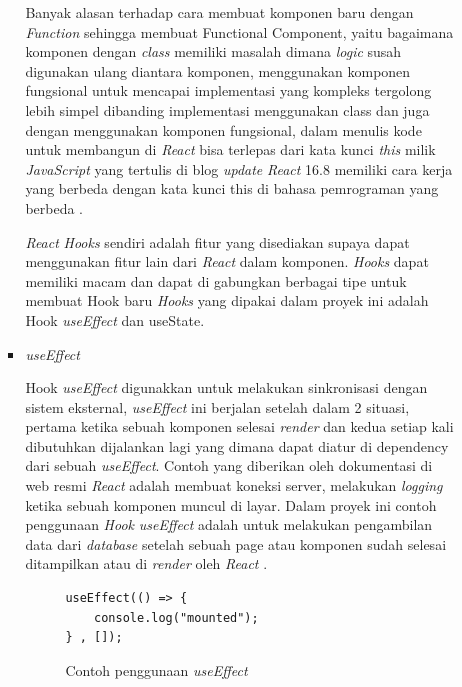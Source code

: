 \documentclass[a4paper]{article}
\begin{document}
\begin{enumerate}[label=\alph*. ]
\begin{enumerate}
\begin{itemize}
                        Banyak alasan terhadap cara membuat komponen baru dengan \textit{Function} sehingga membuat Functional Component, yaitu bagaimana komponen dengan \textit{class} memiliki masalah dimana \textit{logic} susah digunakan ulang diantara komponen, menggunakan komponen fungsional untuk mencapai implementasi yang kompleks tergolong lebih simpel dibanding implementasi menggunakan class dan juga dengan menggunakan komponen fungsional, dalam menulis kode untuk membangun di \textit{React} bisa terlepas dari kata kunci \textit{this} milik \textit{JavaScript} yang tertulis di blog \textit{update} \textit{React} 16.8 memiliki cara kerja yang berbeda dengan kata kunci this di bahasa pemrograman yang berbeda \autocite{React_functional_components_hooks}.

                        \textit{React} \textit{Hooks} sendiri adalah fitur yang disediakan supaya dapat menggunakan fitur lain dari \textit{React} dalam komponen. \textit{Hooks} dapat memiliki macam dan dapat di gabungkan berbagai tipe untuk membuat Hook baru \autocite{React_general_hooks} \textit{Hooks} yang dipakai dalam proyek ini adalah Hook \textit{useEffect} dan useState.

                        \item \textit{useEffect}

                        Hook \textit{useEffect} digunakkan untuk melakukan sinkronisasi dengan sistem eksternal, \textit{useEffect} ini berjalan setelah dalam 2 situasi, pertama ketika sebuah komponen selesai \textit{render} dan kedua setiap kali dibutuhkan dijalankan lagi yang dimana dapat diatur di dependency dari sebuah \textit{useEffect}. Contoh yang diberikan oleh dokumentasi di web resmi \textit{React} adalah membuat koneksi server, melakukan \textit{logging} ketika sebuah komponen muncul di layar. Dalam proyek ini contoh penggunaan \textit{Hook} \textit{useEffect} adalah untuk melakukan pengambilan data dari \textit{database} setelah sebuah page atau komponen sudah selesai ditampilkan atau di \textit{render} oleh \textit{React} \autocite{React_useEffect}.

                        \begin{figure}[h]
                            \centering
                            \begin{lstlisting}[language=HTML]
useEffect(() => {
    console.log("mounted");
} , []);
                            \end{lstlisting}
                            \caption{Contoh penggunaan \textit{useEffect}}
                        \end{figure}


\end{itemize}
\end{enumerate}
\end{enumerate}
\end{document}
